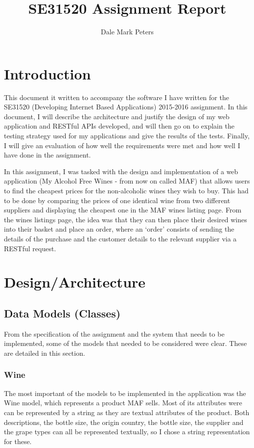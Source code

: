 \documentclass[a4paper,12pt,hidelinks]{report}
\title{SE31520 Assignment Report}
\author{Dale Mark Peters}
\begin{document}
\maketitle

\tableofcontents\newpage
\chapter{Introduction}
    This document it written to accompany the software I have written for the SE31520 (Developing Internet Based Applications) 2015-2016 assignment. In this
    document, I will describe the architecture and justify the design of my web application and RESTful APIs developed, and will then go on
    to explain the testing strategy used for my applications and give the results of the tests. Finally, I will give an evaluation of how well the requirements
    were met and how well I have done in the assignment.

    In this assignment, I was tasked with the design and implementation of a web application (My Alcohol Free Wines - from now on called MAF) that allows users to find the cheapest prices
    for the non-alcoholic wines they wish to buy. This had to be done by comparing the prices of one identical wine from two different suppliers and displaying the
    cheapest one in the MAF wines listing page. From the wines listings page, the idea was that they can then place their desired wines into their basket and place
    an order, where an `order' consists of sending the details of the purchase and the customer details to the relevant supplier via a RESTful request.

\chapter{Design/Architecture}
    \section{Data Models (Classes)}
    From the specification of the assignment and the system that needs to be implemented, some of the models that needed to be considered were clear.
    These are detailed in this section.
    
    \subsection{Wine}
    The most important of the models to be implemented in the application was the Wine model, which represents a product MAF sells. Most of its attributes were
    can be represented by a string as they are textual attributes of the product. Both descriptions, the bottle size, the origin country, the bottle size, the supplier
    and the grape types can all be represented textually, so I chose a string representation for these.
    
\end{document}
